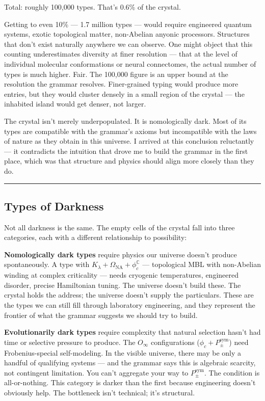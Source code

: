 \documentclass[12pt,a4paper]{article}
\begin{document}
Total: roughly 100,000 types. That's 0.6\% of the crystal.

Getting to even 10\% --- 1.7 million types --- would require engineered quantum systems, exotic topological matter, non-Abelian anyonic processors. Structures that don't exist naturally anywhere we can observe. One might object that this counting underestimates diversity at finer resolution --- that at the level of individual molecular conformations or neural connectomes, the actual number of types is much higher. Fair. The 100,000 figure is an upper bound at the resolution the grammar resolves. Finer-grained typing would produce more entries, but they would cluster densely in a small region of the crystal --- the inhabited island would get denser, not larger.

The crystal isn't merely underpopulated. It is nomologically dark. Most of its types are compatible with the grammar's axioms but incompatible with the laws of nature as they obtain in this universe. I arrived at this conclusion reluctantly --- it contradicts the intuition that drove me to build the grammar in the first place, which was that structure and physics should align more closely than they do.

\begin{center}
\rule{0.5\textwidth}{0.4pt}
\end{center}

\subsection{Types of Darkness}

Not all darkness is the same. The empty cells of the crystal fall into three categories, each with a different relationship to possibility:

\textbf{Nomologically dark types} require physics our universe doesn't produce spontaneously. A type with $K_{\lambda} + \Omega_\text{NA} + \phi_c^\mathbb{C}$ --- topological MBL with non-Abelian winding at complex criticality --- needs cryogenic temperatures, engineered disorder, precise Hamiltonian tuning. The universe doesn't build these. The crystal holds the address; the universe doesn't supply the particulars. These are the types we can still fill through laboratory engineering, and they represent the frontier of what the grammar suggests we should try to build.

\textbf{Evolutionarily dark types} require complexity that natural selection hasn't had time or selective pressure to produce. The $O_{\infty}$ configurations ($\phi_c + P_{\pm}^{\text{sym}}$) need Frobenius-special self-modeling. In the visible universe, there may be only a handful of qualifying systems --- and the grammar says this is algebraic scarcity, not contingent limitation. You can't aggregate your way to $P_{\pm}^{\text{sym}}$. The condition is all-or-nothing. This category is darker than the first because engineering doesn't obviously help. The bottleneck isn't technical; it's structural.
\end{document}
